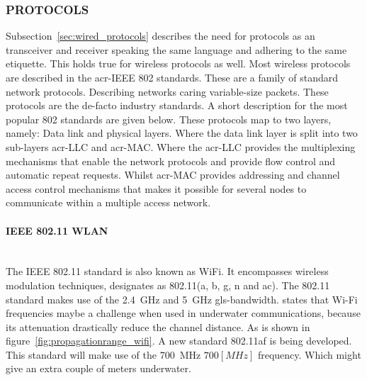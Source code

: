\subsubsection{PROTOCOLS}
Subsection~\ref{sec:wired_protocols} describes the need for protocols as an transceiver and receiver speaking the same language and adhering to the same etiquette. This holds true for wireless protocols as well. Most wireless protocols are described in the \gls{acr-IEEE} 802 standards. These are a family of standard network protocols. Describing networks caring variable-size packets. These protocols are the de-facto industry standards. A short description for the most popular 802 standards are given below. These protocols map to two layers, namely: Data link and physical layers. Where the data link layer is split into two sub-layers \gls{acr-LLC} and \gls{acr-MAC}. Where the \gls{acr-LLC} provides the multiplexing mechanisms that enable the network protocols and provide flow control and automatic repeat requests. Whilst \gls{acr-MAC} provides addressing and channel access control mechanisms that makes it possible for several nodes to communicate within a multiple access network.

\paragraph{IEEE 802.11 WLAN} \hfil \\
The IEEE 802.11 standard is also known as WiFi. It encompasses wireless modulation techniques, designates as 802.11(a, b, g, n and ac). The 802.11 standard makes use of the \SI{2.4}{\giga\hertz} and \SI{5}{\giga\hertz} \gls{gls-bandwidth}. \citet{freitas_evaluation_2014} states that Wi-Fi frequencies maybe a challenge when used in underwater communications, because its attenuation drastically reduce the channel distance. As is shown in figure~\ref{fig:propagationrange_wifi}.
A new standard 802.11af is being developed. This standard will make use of the \SI{700}{\mega\hertz} $ 700 [MHz] $ frequency. Which might give an extra couple of meters underwater.

